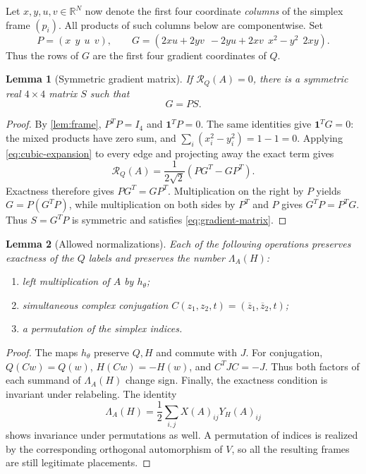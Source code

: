 \documentclass[11pt,reqno]{amsart}
\newtheorem{lemma}[lemma]{Lemma}
\theoremstyle{definition}
\theoremstyle{remark}
\numberwithin{equation}{section}
\newcommand{\R}{\mathbb R}
\newcommand{\one}{\mathbf 1}
\begin{document}
Let $x,y,u,v\in\R^N$ now denote the first four coordinate
\emph{columns} of the simplex frame $(p_i)$. All products of such
columns below are componentwise. Set
\begin{equation}\label{eq:P-and-G}
 P=(x\ \ y\ \ u\ \ v),\qquad
 G=(2xu+2yv\ \ -2yu+2xv\ \ x^2-y^2\ \ 2xy).
\end{equation}
Thus the rows of $G$ are the first four gradient coordinates of $Q$.

\begin{lemma}[Symmetric gradient matrix]\label{lem:gradient}
If $\mathcal R_Q(A)=0$, there is a symmetric real $4\times4$ matrix
$S$ such that
\begin{equation}\label{eq:gradient-matrix}
 G=PS.
\end{equation}
\end{lemma}
\begin{proof}
By \cref{lem:frame}, $P^TP=I_4$ and $\one^TP=0$.
The same identities give $\one^TG=0$: the mixed products have
zero sum, and $\sum_i(x_i^2-y_i^2)=1-1=0$.
Applying \eqref{eq:cubic-expansion} to every edge and projecting
away the exact term gives
\begin{equation}\label{eq:cubic-residual}
 \mathcal R_Q(A)=\frac1{2\sqrt2}(PG^T-GP^T).
\end{equation}
Exactness therefore gives $PG^T=GP^T$. Multiplication on the right
by $P$ yields $G=P(G^TP)$, while multiplication on both sides by
$P^T$ and $P$ gives $G^TP=P^TG$. Thus $S=G^TP$ is symmetric and
satisfies \eqref{eq:gradient-matrix}.
\end{proof}

\begin{lemma}[Allowed normalizations]\label{lem:normalizations}
Each of the following operations preserves exactness of the $Q$
labels and preserves the number $\Lambda_A(H)$:
\begin{enumerate}[label=(\roman*)]
 \item left multiplication of $A$ by $h_\theta$;
 \item simultaneous complex conjugation
       $C(z_1,z_2,t)=(\overline z_1,\overline z_2,t)$;
 \item a permutation of the simplex indices.
\end{enumerate}
\end{lemma}
\begin{proof}
The maps $h_\theta$ preserve $Q,H$ and commute with $J$.
For conjugation, $Q(Cw)=Q(w)$, $H(Cw)=-H(w)$, and $C^TJC=-J$.
Thus both factors of each summand of $\Lambda_A(H)$ change sign.
Finally, the exactness condition is invariant under relabeling.
The identity
\[
 \Lambda_A(H)=\frac12\sum_{i,j}X(A)_{ij}Y_H(A)_{ij}
\]
shows invariance under permutations as well. A permutation of
indices is realized by the corresponding orthogonal automorphism
of $V$, so all the resulting frames are still legitimate placements.
\end{proof}
\end{document}
